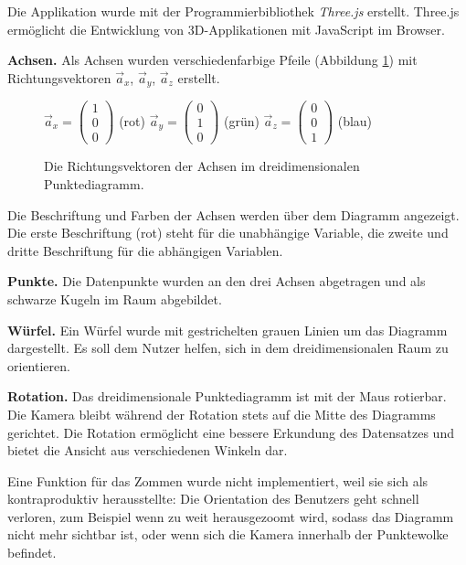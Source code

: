 Die Applikation wurde mit der Programmierbibliothek \textit{Three.js} \cite{threejs} erstellt. Three.js ermöglicht die Entwicklung von 3D-Applikationen mit JavaScript im Browser.

\textbf{Achsen.} Als Achsen wurden verschiedenfarbige Pfeile (Abbildung \ref{fig:vectors}) mit Richtungsvektoren $\vec{a}_x$, $\vec{a}_y$, $\vec{a}_z$ erstellt.

\begin{figure}[H]
	\centering
	$\vec{a}_x=\begin{pmatrix} 1 \\ 0 \\ 0 \end{pmatrix}$ (rot)\qquad
	$\vec{a}_y=\begin{pmatrix} 0 \\ 1 \\ 0 \end{pmatrix}$ (grün)\qquad
	$\vec{a}_z=\begin{pmatrix} 0 \\ 0 \\ 1 \end{pmatrix}$ (blau)\qquad
	\caption{Die Richtungsvektoren der Achsen im dreidimensionalen Punktediagramm.}
	\label{fig:vectors}
\end{figure}

Die Beschriftung und Farben der Achsen werden über dem Diagramm angezeigt. Die erste Beschriftung (rot) steht für die unabhängige Variable, die zweite und dritte Beschriftung für die abhängigen Variablen.

\textbf{Punkte.} Die Datenpunkte wurden an den drei Achsen abgetragen und als schwarze Kugeln im Raum abgebildet.

\textbf{Würfel.} Ein Würfel wurde mit gestrichelten grauen Linien um das Diagramm dargestellt. Es soll dem Nutzer helfen, sich in dem dreidimensionalen Raum zu orientieren.

\textbf{Rotation.} Das dreidimensionale Punktediagramm ist mit der Maus rotierbar. Die Kamera bleibt während der Rotation stets auf die Mitte des Diagramms gerichtet. Die Rotation ermöglicht eine bessere Erkundung des Datensatzes und bietet die Ansicht aus verschiedenen Winkeln dar.

Eine Funktion für das Zommen wurde nicht implementiert, weil sie sich als kontraproduktiv herausstellte: Die Orientation des Benutzers geht schnell verloren, zum Beispiel wenn zu weit herausgezoomt wird, sodass das Diagramm nicht mehr sichtbar ist, oder wenn sich die Kamera innerhalb der Punktewolke befindet.

